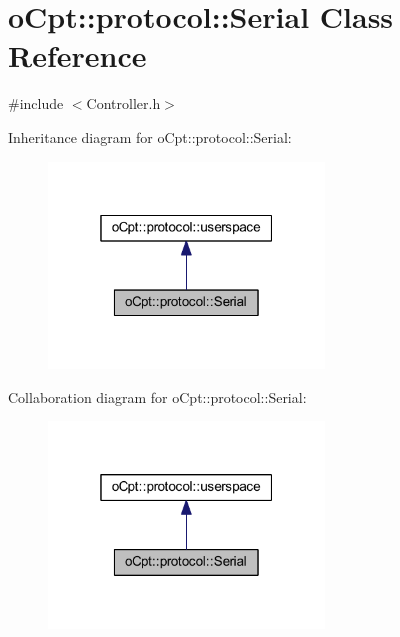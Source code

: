 \hypertarget{classo_cpt_1_1protocol_1_1_serial}{}\section{o\+Cpt\+:\+:protocol\+:\+:Serial Class Reference}
\label{classo_cpt_1_1protocol_1_1_serial}


{\ttfamily \#include $<$Controller.\+h$>$}



Inheritance diagram for o\+Cpt\+:\+:protocol\+:\+:Serial\+:\nopagebreak
\begin{figure}[H]
\begin{center}
\leavevmode
\includegraphics[width=208pt]{classo_cpt_1_1protocol_1_1_serial__inherit__graph}
\end{center}
\end{figure}


Collaboration diagram for o\+Cpt\+:\+:protocol\+:\+:Serial\+:\nopagebreak
\begin{figure}[H]
\begin{center}
\leavevmode
\includegraphics[width=208pt]{classo_cpt_1_1protocol_1_1_serial__coll__graph}
\end{center}
\end{figure}
